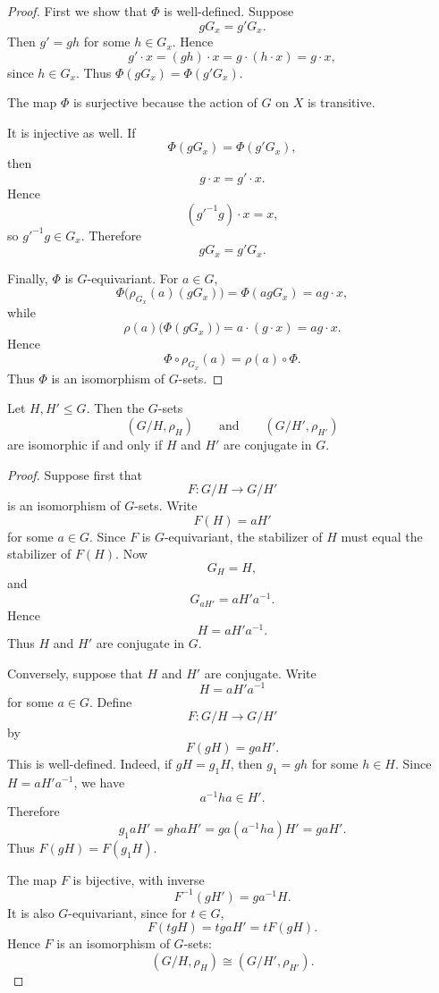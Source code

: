 \begin{proof}
    First we show that \(\Phi\) is well-defined. Suppose
    \[
        gG_x=g'G_x.
    \]
    Then \(g'=gh\) for some \(h\in G_x\). Hence
    \[
        g'\cdot x=(gh)\cdot x=g\cdot (h\cdot x)=g\cdot x,
    \]
    since \(h\in G_x\). Thus \(\Phi(gG_x)=\Phi(g'G_x)\).

    The map \(\Phi\) is surjective because the action of \(G\) on \(X\) is
    transitive.

    It is injective as well. If
    \[
        \Phi(gG_x)=\Phi(g'G_x),
    \]
    then
    \[
        g\cdot x=g'\cdot x.
    \]
    Hence
    \[
        (g'^{-1}g)\cdot x=x,
    \]
    so \(g'^{-1}g\in G_x\). Therefore
    \[
        gG_x=g'G_x.
    \]

    Finally, \(\Phi\) is \(G\)-equivariant. For \(a\in G\),
    \[
        \Phi\bigl(\rho_{G_x}(a)(gG_x)\bigr)
        =
        \Phi(agG_x)
        =
        ag\cdot x,
    \]
    while
    \[
        \rho(a)\bigl(\Phi(gG_x)\bigr)
        =
        a\cdot (g\cdot x)
        =
        ag\cdot x.
    \]
    Hence
    \[
        \Phi\circ \rho_{G_x}(a)
        =
        \rho(a)\circ \Phi.
    \]
    Thus \(\Phi\) is an isomorphism of \(G\)-sets.
\end{proof}

\begin{theorem}
    Let \(H,H'\leq G\). Then the \(G\)-sets
    \[
        (G/H,\rho_H)
        \qquad\text{and}\qquad
        (G/H',\rho_{H'})
    \]
    are isomorphic if and only if \(H\) and \(H'\) are conjugate in \(G\).
\end{theorem}

\begin{proof}
    Suppose first that
    \[
        F:G/H\longrightarrow G/H'
    \]
    is an isomorphism of \(G\)-sets. Write
    \[
        F(H)=aH'
    \]
    for some \(a\in G\). Since \(F\) is \(G\)-equivariant, the stabilizer of \(H\)
    must equal the stabilizer of \(F(H)\). Now
    \[
        G_H=H,
    \]
    and
    \[
        G_{aH'}=aH'a^{-1}.
    \]
    Hence
    \[
        H=aH'a^{-1}.
    \]
    Thus \(H\) and \(H'\) are conjugate in \(G\).

    Conversely, suppose that \(H\) and \(H'\) are conjugate. Write
    \[
        H=aH'a^{-1}
    \]
    for some \(a\in G\). Define
    \[
        F:G/H\longrightarrow G/H'
    \]
    by
    \[
        F(gH)=gaH'.
    \]
    This is well-defined. Indeed, if \(gH=g_1H\), then \(g_1=gh\) for some
    \(h\in H\). Since \(H=aH'a^{-1}\), we have
    \[
        a^{-1}ha\in H'.
    \]
    Therefore
    \[
        g_1aH'=ghaH'=ga(a^{-1}ha)H'=gaH'.
    \]
    Thus \(F(gH)=F(g_1H)\).

    The map \(F\) is bijective, with inverse
    \[
        F^{-1}(gH')=ga^{-1}H.
    \]
    It is also \(G\)-equivariant, since for \(t\in G\),
    \[
        F(tgH)=tgaH'=tF(gH).
    \]
    Hence \(F\) is an isomorphism of \(G\)-sets:
    \[
        (G/H,\rho_H)\cong (G/H',\rho_{H'}).
    \]
\end{proof}

